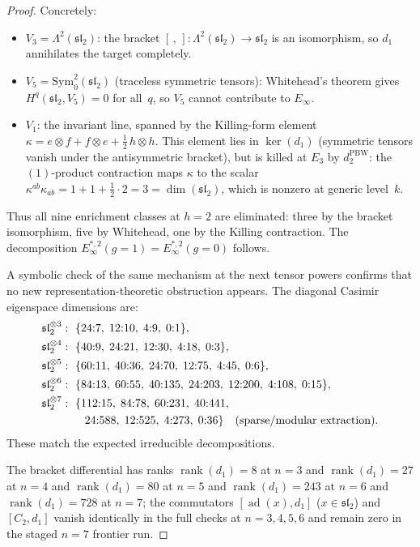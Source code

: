 \begin{proof}
Concretely:
\begin{itemize}
\item $V_3 = \Lambda^2(\mathfrak{sl}_2)$: the bracket
  $[\,,\,]\colon \Lambda^2(\mathfrak{sl}_2)
  \to \mathfrak{sl}_2$ is an isomorphism,
  so $d_1$ annihilates the target completely.
\item $V_5 = \mathrm{Sym}^2_0(\mathfrak{sl}_2)$
  (traceless symmetric tensors):
  Whitehead's theorem gives
  $H^q(\mathfrak{sl}_2, V_5) = 0$ for all~$q$, so $V_5$
  cannot contribute to $E_\infty$.
\item $V_1$: the invariant line, spanned by the
  Killing-form element
  $\kappa = e \otimes f + f \otimes e
  + \tfrac{1}{2}\,h \otimes h$.
  This element lies in $\ker(d_1)$ (symmetric tensors
  vanish under the antisymmetric bracket), but is killed
  at $E_3$ by $d_2^{\mathrm{PBW}}$: the $(1)$-product
  contraction maps $\kappa$ to the scalar
  $\kappa^{ab}\kappa_{ab} = 1 + 1 + \tfrac{1}{2} \cdot 2
  = 3 = \dim(\mathfrak{sl}_2)$,
  which is nonzero at generic level~$k$.
\end{itemize}

Thus all nine enrichment classes at $h = 2$ are eliminated:
three by the bracket isomorphism, five by Whitehead, one by the
Killing contraction.
The decomposition $E_\infty^{*,2}(g{=}1) =
E_\infty^{*,2}(g{=}0)$ follows.

A symbolic check of the same mechanism at the next tensor
powers
confirms that no new representation-theoretic obstruction
appears.  The diagonal Casimir eigenspace dimensions are:
\[
\begin{aligned}
\mathfrak{sl}_2^{\otimes 3}&:\ \{24{:}7,\;12{:}10,\;4{:}9,\;0{:}1\},\\
\mathfrak{sl}_2^{\otimes 4}&:\ \{40{:}9,\;24{:}21,\;12{:}30,\;4{:}18,\;0{:}3\},\\
\mathfrak{sl}_2^{\otimes 5}&:\ \{60{:}11,\;40{:}36,\;24{:}70,\;12{:}75,\;4{:}45,\;0{:}6\},\\
\mathfrak{sl}_2^{\otimes 6}&:\ \{84{:}13,\;60{:}55,\;40{:}135,\;24{:}203,\;12{:}200,\;4{:}108,\;0{:}15\},\\
\mathfrak{sl}_2^{\otimes 7}&:\ \{112{:}15,\;84{:}78,\;60{:}231,\;40{:}441,\\
&\qquad 24{:}588,\;12{:}525,\;4{:}273,\;0{:}36\}
\quad\textup{(sparse/modular extraction).}
\end{aligned}
\]
These match the expected irreducible decompositions.

The bracket differential has ranks
$\operatorname{rank}(d_1)=8$ at $n=3$ and
$\operatorname{rank}(d_1)=27$ at $n=4$ and
$\operatorname{rank}(d_1)=80$ at $n=5$ and
$\operatorname{rank}(d_1)=243$ at $n=6$ and
$\operatorname{rank}(d_1)=728$ at $n=7$; the commutators
$[\operatorname{ad}(x), d_1]$ ($x \in \mathfrak{sl}_2$) and
$[C_2, d_1]$ vanish identically in the full checks at
$n=3,4,5,6$ and remain zero in the staged $n=7$ frontier run.


\end{proof}

